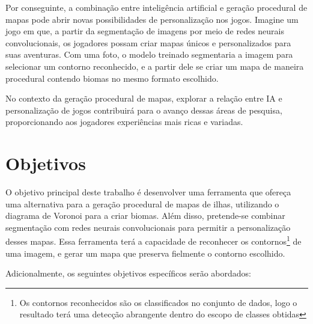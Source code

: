 Por conseguinte, a combinação entre inteligência artificial e geração procedural de mapas pode abrir novas possibilidades de personalização nos jogos. Imagine um jogo em que, a partir da segmentação de imagens por meio de redes neurais convolucionais, os jogadores possam criar mapas únicos e personalizados para suas aventuras. Com uma foto, o modelo treinado segmentaria a imagem para selecionar um contorno reconhecido, e a partir dele se criar um mapa de maneira procedural contendo biomas no mesmo formato escolhido. 

No contexto da geração procedural de mapas, explorar a relação entre IA e personalização de jogos contribuirá para o avanço dessas áreas de pesquisa, proporcionando aos jogadores experiências mais ricas e variadas.



\section{Objetivos}

O objetivo principal deste trabalho é desenvolver uma ferramenta que ofereça uma alternativa para a geração procedural de mapas de ilhas, utilizando o diagrama de Voronoi para a criar biomas. Além disso, pretende-se combinar segmentação com redes neurais convolucionais para permitir a personalização desses mapas. Essa ferramenta terá a capacidade de reconhecer os contornos\footnote{Os contornos reconhecidos são os classificados no conjunto de dados, logo o resultado terá uma detecção abrangente dentro do escopo de classes obtidas} de uma imagem, e gerar um mapa que preserva fielmente o contorno escolhido.

Adicionalmente, os seguintes objetivos específicos serão abordados:

